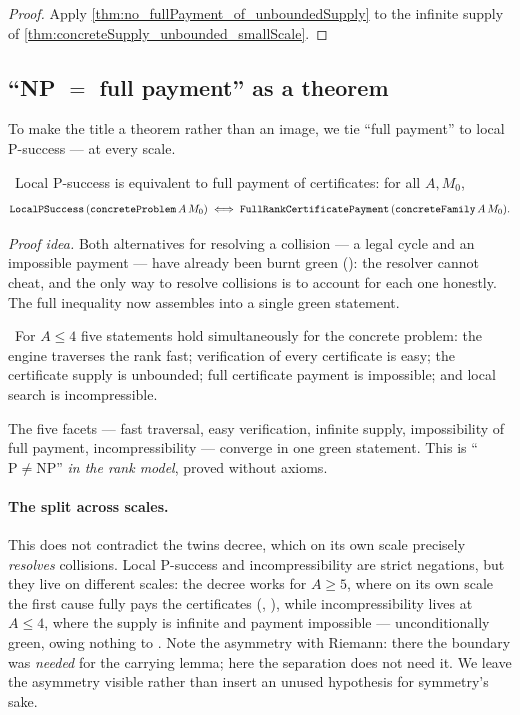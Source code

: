 \begin{proof}
Apply \cref{thm:no_fullPayment_of_unboundedSupply} to the infinite supply of
\cref{thm:concreteSupply_unbounded_smallScale}.
\end{proof}

\subsection{``NP $=$ full payment'' as a theorem}

To make the title a theorem rather than an image, we tie ``full payment'' to local P-success --- at
every scale.

\begin{theorem}\label{thm:concrete_localPSuccess_iff_fullPayment}
\green{}\ Local P-success is equivalent to full payment of certificates: for all $A, M_0$,
\[
   \texttt{LocalPSuccess}\,(\texttt{concreteProblem}\,A\,M_0)
   \iff
   \texttt{FullRankCertificatePayment}\,(\texttt{concreteFamily}\,A\,M_0).
\]
\end{theorem}

\emph{Proof idea.} Both alternatives for resolving a collision --- a legal cycle and an impossible
payment --- have already been burnt green (): the
resolver cannot cheat, and the only way to resolve collisions is to account for each one honestly.
The full inequality now assembles into a single green statement.

\begin{theorem}\label{thm:pnp_rank_separation_smallScale}
\green{}\ For $A \le 4$ five statements hold simultaneously for the concrete problem: the engine
traverses the rank fast; verification of every certificate is easy; the certificate supply is
unbounded; full certificate payment is impossible; and local search is incompressible.
\end{theorem}

The five facets --- fast traversal, easy verification, infinite supply, impossibility of full
payment, incompressibility --- converge in one green statement. This is ``$\mathrm{P}\neq\mathrm{NP}$''
\emph{in the rank model}, proved without axioms.

\paragraph{The split across scales.}
This does not contradict the twins decree, which on its own scale precisely \emph{resolves}
collisions. Local P-success and incompressibility are strict negations, but they live on different
scales: the decree works for $A \ge 5$, where on its own scale the first cause fully pays the
certificates (, \yellow{}), while incompressibility lives at
$A \le 4$, where the supply is infinite and payment impossible --- unconditionally green, owing
nothing to \axiom{}. Note the asymmetry with Riemann: there the boundary was \emph{needed} for the
carrying lemma; here the separation does not need it. We leave the asymmetry visible rather than
insert an unused hypothesis for symmetry's sake.

